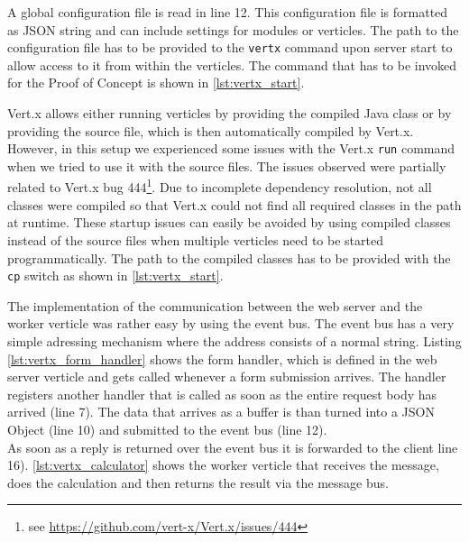 A global configuration file is read in line 12. This configuration file is
formatted as JSON string and can include settings for modules or verticles. The
path to the configuration file has to be provided to the \texttt{vertx} command
upon server start to allow access to it from within the verticles.
The command that has to be invoked for the Proof of Concept is shown in \autoref{lst:vertx_start}.



Vert.x allows either running verticles by providing the compiled Java class or by providing the
source file, which is then automatically compiled by Vert.x. However, in this
setup we experienced some issues with the Vert.x \texttt{run} command when we tried to
use it with the source files. The issues observed were partially related to
Vert.x bug 444\footnote{see \url{https://github.com/vert-x/Vert.x/issues/444}}.
Due to incomplete dependency resolution, not all classes were compiled so that
Vert.x could not find all required classes in the path at runtime.
These startup issues can easily be avoided by using compiled classes instead of
the source files when multiple verticles need to be started programmatically.
The path to the compiled classes has to be provided with the \texttt{cp} switch as
shown in \autoref{lst:vertx_start}.

\clearpage





The implementation of the communication between the web server and the worker
verticle was rather easy by using the event bus. The event bus has a very
simple adressing mechanism where the address consists of a normal string.
Listing \ref{lst:vertx_form_handler} shows the form handler, which is defined
in the web server verticle and gets called whenever a form submission arrives.
The handler registers another handler that is called as soon as the entire
request body has arrived (line 7). The data that arrives as a buffer is than
turned into a JSON Object (line 10) and submitted to the event bus (line 12).\\
As soon as a reply is returned over the event bus it is forwarded to the client line 16).
\autoref{lst:vertx_calculator} shows the worker verticle that receives
the message, does the calculation and then returns the result via the message bus.

